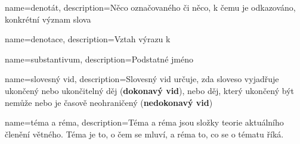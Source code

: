 {
	name=denotát,
	description={Něco označovaného či něco, k čemu je odkazováno, konkrétní význam slova}
}

{
	name=denotace,
	description={Vztah výrazu k }
}



{
	name=substantivum,
	description={Podstatné jméno}
}

{
	name=slovesný vid,
	description={Slovesný vid určuje, zda sloveso vyjadřuje ukončený nebo ukončitelný děj (\textbf{dokonavý vid}), nebo děj, který ukončený být nemůže nebo je časově neohraničený (\textbf{nedokonavý vid})}
}

{
	name=téma a réma,
	description={Téma a réma jsou složky teorie aktuálního členění větného. Téma je to, o čem se mluví, a réma to, co se o tématu říká. }
}




\makeglossaries